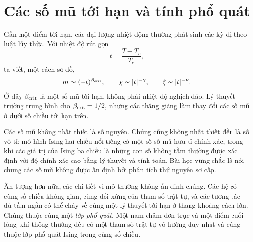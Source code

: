\section{Các số mũ tới hạn và tính phổ quát}

Gần một điểm tới hạn, các đại lượng nhiệt động thường phát sinh các kỳ dị theo luật lũy thừa. Với nhiệt độ rút gọn
\begin{equation}
t=\frac{T-T_c}{T_c},
\end{equation}
ta viết, một cách sơ đồ,
\begin{equation}
m\sim(-t)^{\beta_{\rm crit}},
\qquad
\chi\sim |t|^{-\gamma},
\qquad
\xi\sim |t|^{-\nu}.
\label{eq:critical-exponents}
\end{equation}
Ở đây \(\beta_{\rm crit}\) là một số mũ tới hạn, không phải nhiệt độ nghịch đảo. Lý thuyết trường trung bình cho \(\beta_{\rm crit}=1/2\), nhưng các thăng giáng làm thay đổi các số mũ ở dưới số chiều tới hạn trên.

Các số mũ không nhất thiết là số nguyên. Chúng cũng không nhất thiết đều là số vô tỉ: mô hình Ising hai chiều nổi tiếng có một số số mũ hữu tỉ chính xác, trong khi các giá trị của Ising ba chiều là những con số không tầm thường được xác định với độ chính xác cao bằng lý thuyết và tính toán. Bài học vững chắc là nói chung các số mũ không được ấn định bởi phân tích thứ nguyên sơ cấp.

Ấn tượng hơn nữa, các chi tiết vi mô thường không ấn định chúng. Các hệ có cùng số chiều không gian, cùng đối xứng của tham số trật tự, và các tương tác đủ tầm ngắn có thể chảy về cùng một lý thuyết tới hạn ở thang khoảng cách lớn. Chúng thuộc cùng một \emph{lớp phổ quát}. Một nam châm đơn trục và một điểm cuối lỏng--khí thông thường đều có một tham số trật tự vô hướng duy nhất và cùng thuộc lớp phổ quát Ising trong cùng số chiều.

\begin{classroomqa}
\end{classroomqa}

